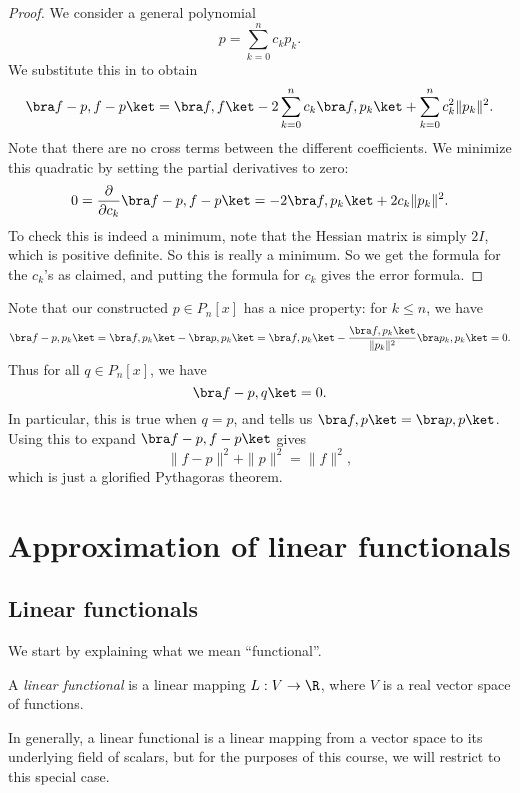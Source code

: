 \documentclass[a4paper]{article}
\begin{document}
\begin{proof}
  We consider a general polynomial
  \[
    p = \sum_{k = 0}^n c_k p_k.
  \]
  We substitute this in to obtain
  \[
    \bra f - p, f - p\ket = \bra f, f\ket - 2 \sum_{k = 0}^n c_k \bra f, p_k\ket + \sum_{k = 0}^n c_k^2 \|p_k\|^2.
  \]
  Note that there are no cross terms between the different coefficients. We minimize this quadratic by setting the partial derivatives to zero:
  \[
    0 = \frac{\partial}{\partial c_k} \bra f - p, f - p\ket = -2 \bra f, p_k\ket + 2c_k \|p_k\|^2.
  \]
  To check this is indeed a minimum, note that the Hessian matrix is simply $2I$, which is positive definite. So this is really a minimum. So we get the formula for the $c_k$'s as claimed, and putting the formula for $c_k$ gives the error formula.
\end{proof}

Note that our constructed $p \in P_n[x]$ has a nice property: for $k \leq n$, we have
\[
  \bra f - p, p_k\ket = \bra f, p_k\ket - \bra p, p_k\ket = \bra f, p_k\ket - \frac{\bra f, p_k\ket}{\|p_k\|^2} \bra p_k, p_k\ket = 0.
\]
Thus for all $q \in P_n[x]$, we have
\[
  \bra f - p, q\ket = 0.
\]
In particular, this is true when $q = p$, and tells us $\bra f, p\ket = \bra p, p\ket$. Using this to expand $\bra f - p, f - p\ket$ gives
\[
  \|f - p\|^2 + \|p\|^2 = \|f\|^2,
\]
which is just a glorified Pythagoras theorem.
\section{Approximation of linear functionals}
\subsection{Linear functionals}
We start by explaining what we mean ``functional''.
\begin{defi}
  A \emph{linear functional} is a linear mapping $L: V \to \R$, where $V$ is a real vector space of functions.
\end{defi}
In generally, a linear functional is a linear mapping from a vector space to its underlying field of scalars, but for the purposes of this course, we will restrict to this special case.
\end{document}
